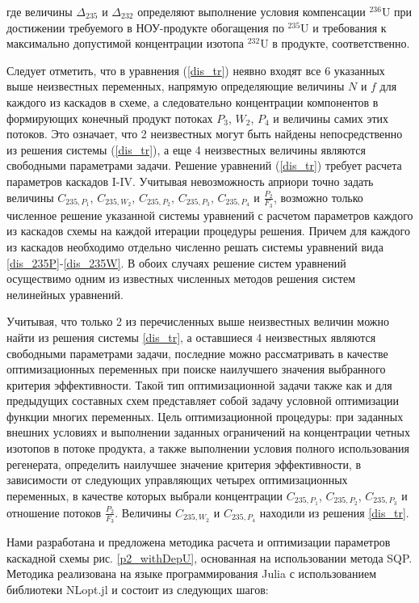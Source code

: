 где величины  $\Delta_{235}$ и $\Delta_{232}$ определяют выполнение условия компенсации $^{236}$U при достижении требуемого в НОУ-продукте обогащения по $^{235}$U и требования к максимально допустимой концентрации изотопа $^{232}$U в продукте, соответственно.

Следует отметить, что в уравнения (\ref{dis_tr}) неявно входят все 6 указанных выше неизвестных переменных, напрямую определяющие величины $N$ и $f$ для каждого из каскадов в схеме, а следовательно концентрации компонентов в формирующих конечный продукт потоках $P_3$, $W_2$, $P_4$ и величины самих этих потоков. Это означает, что 2 неизвестных могут быть найдены непосредственно из решения системы (\ref{dis_tr}), а еще 4 неизвестных величины являются свободными параметрами задачи. Решение уравнений (\ref{dis_tr}) требует расчета параметров каскадов I-IV. Учитывая невозможность априори точно задать величины $C_{235,{P_1}}$, $C_{235,{W_2}}$, $C_{235,{P_2}}$, $C_{235,{P_3}}$, $C_{235,{P_4}}$ и $\frac{P_{2}}{F_3}$, возможно только численное решение указанной системы уравнений с расчетом параметров каждого из каскадов схемы на каждой итерации процедуры решения. Причем для каждого из каскадов необходимо отдельно численно решать системы уравнений вида \ref{dis_235P}-\ref{dis_235W}. В обоих случаях решение систем уравнений осуществимо одним из известных численных методов решения систем нелинейных уравнений. 

Учитывая, что только 2 из перечисленных выше неизвестных величин можно найти из решения системы \ref{dis_tr}, а оставшиеся 4 неизвестных являются свободными параметрами задачи, последние можно рассматривать в качестве оптимизационных переменных при поиске наилучшего значения выбранного критерия эффективности. Такой тип оптимизационной задачи также как и для предыдущих составных схем представляет собой задачу условной оптимизации функции многих переменных. Цель оптимизационной процедуры: при заданных внешних условиях и выполнении заданных ограничений на концентрации четных изотопов в потоке продукта, а также выполнении условия полного использования регенерата, определить наилучшее значение критерия эффективности, в зависимости от следующих управляющих четырех оптимизационных переменных, в качестве которых выбрали концентрации $C_{235,{P_1}}$, $C_{235,{P_2}}$, $C_{235,{P_3}}$ и отношение потоков $\frac{P_{2}}{F_3}$. Величины $C_{235,{W_2}}$ и $C_{235,{P_4}}$ находили из решения \ref{dis_tr}. 

Нами разработана и предложена методика расчета и оптимизации параметров каскадной схемы рис. \ref{p2_withDepU}, основанная на использовании метода SQP.
Методика реализована на языке программирования Julia с использованием библиотеки NLopt.jl \cite{NLopt} и состоит из следующих шагов:

